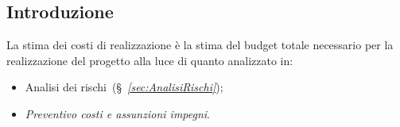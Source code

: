 \subsection{Introduzione}
La stima dei costi di realizzazione è la stima del budget totale necessario per la realizzazione del progetto alla luce di quanto analizzato in: 
\begin{itemize}
    \item Analisi dei rischi~(\S~\textit{\ref{sec:AnalisiRischi}});
    \item \textit{Preventivo costi e assunzioni impegni}.
\end{itemize}
